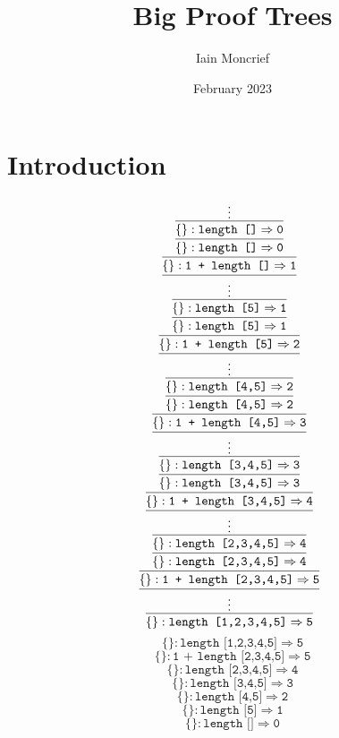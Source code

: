 \documentclass{article}
\title{Big Proof Trees}
\author{Iain Moncrief}
\date{February 2023}
\def\code#1{\texttt{#1}}
\begin{document}

\maketitle

\section{Introduction}


$$\infer[]{\{  \} : \code{length [1,2,3,4,5]} \Rightarrow \code{5}}{\infer[]{\vdots}{\infer[]{\{  \} : \code{1 + length [2,3,4,5]} \Rightarrow \code{5}}{\infer[]{\{  \} : \code{length [2,3,4,5]} \Rightarrow \code{4}}{\infer[]{\{  \} : \code{length [2,3,4,5]} \Rightarrow \code{4}}{\infer[]{\vdots}{\infer[]{\{  \} : \code{1 + length [3,4,5]} \Rightarrow \code{4}}{\infer[]{\{  \} : \code{length [3,4,5]} \Rightarrow \code{3}}{\infer[]{\{  \} : \code{length [3,4,5]} \Rightarrow \code{3}}{\infer[]{\vdots}{\infer[]{\{  \} : \code{1 + length [4,5]} \Rightarrow \code{3}}{\infer[]{\{  \} : \code{length [4,5]} \Rightarrow \code{2}}{\infer[]{\{  \} : \code{length [4,5]} \Rightarrow \code{2}}{\infer[]{\vdots}{\infer[]{\{  \} : \code{1 + length [5]} \Rightarrow \code{2}}{\infer[]{\{  \} : \code{length [5]} \Rightarrow \code{1}}{\infer[]{\{  \} : \code{length [5]} \Rightarrow \code{1}}{\infer[]{\vdots}{\infer[]{\{  \} : \code{1 + length []} \Rightarrow \code{1}}{\infer[]{\{  \} : \code{length []} \Rightarrow \code{0}}{\infer[]{\{  \} : \code{length []} \Rightarrow \code{0}}{\vdots}}}}}}}}}}}}}}}}}}}}}$$
$$\{  \} : \code{length [1,2,3,4,5]} \Rightarrow \code{5}$$
$$\{  \} : \code{1 + length [2,3,4,5]} \Rightarrow \code{5}$$
$$\{  \} : \code{length [2,3,4,5]} \Rightarrow \code{4}$$
$$\{  \} : \code{length [3,4,5]} \Rightarrow \code{3}$$
$$\{  \} : \code{length [4,5]} \Rightarrow \code{2}$$
$$\{  \} : \code{length [5]} \Rightarrow \code{1}$$
$$\{  \} : \code{length []} \Rightarrow \code{0}$$
\end{document}
